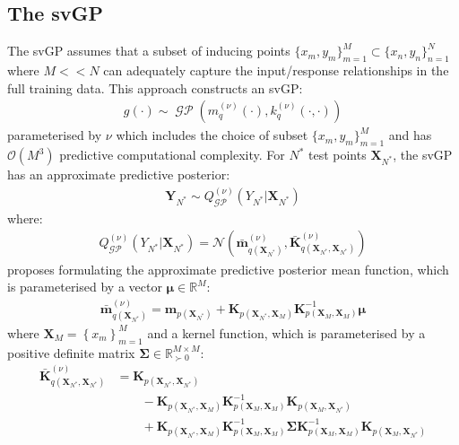 \documentclass{article}
\newcommand{\GP}{\operatorname{\mathcal{GP}}}
\numberwithin{equation}{section}
\begin{document}
\subsection{The svGP}
The svGP assumes that a subset of inducing points $\{x_m, y_m\}_{m=1}^{M} \subset \{x_n, y_n\}_{n=1}^{N}$ where $M << N$ can adequately capture the input/response relationships in the full training data. This approach constructs an svGP:
\begin{align}
g(\cdot) \sim \GP\left(m_q^{(\nu)}(\cdot), k_q^{(\nu)}(\cdot, \cdot)\right)
\label{svgp}
\end{align}
parameterised by $\nu$ which includes the choice of subset $\{x_m, y_m\}_{m=1}^{M}$ and has $\mathcal{O}(M^3)$ predictive computational complexity. For $N^*$ test points $\mathbf{X}_{N^*}$, the svGP has an approximate predictive posterior:
\begin{align}
    \mathbf{Y}_{N^*} \sim Q_{\GP}^{(\nu)}\left(Y_{N^*} \vert \mathbf{X}_{N^*}\right)
\end{align}
where:
\begin{align}
    Q_{\GP}^{(\nu)}\left(Y_{N^*} \vert \mathbf{X}_{N^*}\right) = \mathcal{N}\left(\bar{\mathbf{m}}_{q\left(\mathbf{X}_{N^*}\right)}^{(\nu)}, \bar{\mathbf{K}}_{q\left(\mathbf{X}_{N^*}, \mathbf{X}_{N^*}\right)}^{(\nu)}\right)
\end{align}
\cite{titsias2009variational} proposes formulating the approximate predictive posterior mean function, which is parameterised by a vector $\boldsymbol{\mu} \in \mathbb{R}^M$:
\begin{align}
    \label{svgp-mean} 
    \bar{\mathbf{m}}_{q\left(\mathbf{X}_{N^*}\right)}^{(\nu)} = \mathbf{m}_{p\left(\mathbf{X}_{N^*}\right)} +  \mathbf{K}_{p( \mathbf{X}_{N^*}, \mathbf{X}_M)}\mathbf{K}_{p(\mathbf{X}_M, \mathbf{X}_M)}^{-1} \boldsymbol{\mu}
\end{align}
where $\mathbf{X}_M = \left\{ x_m\right\}_{m=1}^M$ and a kernel function, which is parameterised by a positive definite matrix $\mathbf{\Sigma} \in \mathbb{R}^{M\times M}_{\succ 0}$:
\begin{align}
\bar{\mathbf{K}}_{q\left(\mathbf{X}_{N^*}, \mathbf{X}_{N^*}\right)}^{(\nu)} & = \mathbf{K}_{p\left(\mathbf{X}_{N^*}, \mathbf{X}_{N^*}\right)} \nonumber \\
&\qquad - \mathbf{K}_{p(\mathbf{X}_{N^*}, \mathbf{X}_M)} \mathbf{K}_{p(\mathbf{X}_M, \mathbf{X}_M)}^{-1}\mathbf{K}_{p(\mathbf{X}_M, \mathbf{X}_{N^*})} \nonumber \\
&\qquad + \mathbf{K}_{p(\mathbf{X}_{N^*}, \mathbf{X}_M)}  \mathbf{K}_{p(\mathbf{X}_M, \mathbf{X}_M)}  ^{-1} \mathbf{\Sigma}\mathbf{K}_{p(\mathbf{X}_M, \mathbf{X}_M)}^{-1} \mathbf{K}_{p(\mathbf{X}_M, \mathbf{X}_{N^*})}
\label{svgp-covariance}
\end{align}
\end{document}
